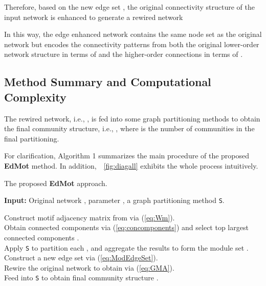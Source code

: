 \documentclass[sigconf]{acmart}
\begin{document}
Therefore, based on the new edge set , the original connectivity structure of the input network is enhanced to generate a rewired network

In this way, the edge enhanced network contains the same node set as the original network but encodes the connectivity patterns from both the original lower-order network structure in terms of  and the higher-order connections in terms of .

\subsection{Method Summary and Computational Complexity}
\label{sec:complexity}

The rewired network, i.e., , is fed into some graph partitioning methods to obtain the final community structure, i.e., , where  is the number of communities in the final partitioning.

For clarification, Algorithm 1 summarizes the main procedure of the proposed \textbf{EdMot} method. In addition,~\figurename~\ref{fig:diagall} exhibits the whole process intuitively.

\begin{algorithm}[htb]
\caption{The proposed \textbf{EdMot} approach.}
\label{alg:Framwork}
{\bfseries Input:} Original network , parameter , a graph partitioning method \texttt{S}.
\begin{algorithmic}[1]
\STATE Construct motif adjacency matrix  from  via (\ref{eq:Wm}).\\
\STATE Obtain connected components  via (\ref{eq:concomponents}) and select top  largest connected components .\\
\STATE Apply \texttt{S} to partition each ,  and aggregate the results to form the module set .\\
\STATE Construct a new edge set  via (\ref{eq:ModEdgeSet}).\\
\STATE Rewire the original network to obtain  via (\ref{eq:GMA}).\\
\STATE Feed  into \texttt{S} to obtain final community structure .\\
\end{algorithmic}
\end{algorithm}
\end{document}
